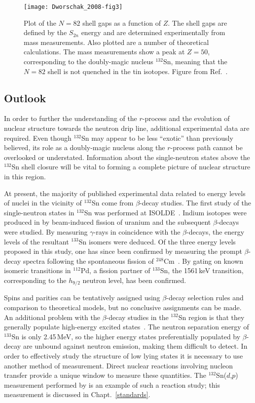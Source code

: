 \begin{figure}%
\centering
\texttt{[image: Dworschak\_2008-fig3]}%
\caption[Plot of the $N=82$ shell gaps as a function of $Z$]{Plot of the $N=82$ shell gaps as a function of $Z$.  The shell gaps are defined by the $S_{2n}$ energy and are determined experimentally from mass measurements.  Also plotted are a number of theoretical calculations.  The mass measurements show a peak at $Z=50$, corresponding to the doubly-magic nucleus $^{132}$Sn, meaning that the $N=82$ shell is not quenched in the tin isotopes.  Figure from Ref.~\cite[Fig.~3]{Dworschak_2008}.}%
\label{50_gap}%
\end{figure}

\subsection{Outlook}
In order to further the understanding of the $r$-process and the evolution of nuclear structure towards the neutron drip line, additional experimental data are required.  Even though $^{132}$Sn may appear to be less ``exotic'' than previously believed, its role as a doubly-magic nucleus along the $r$-process path cannot be overlooked or understated.  Information about the single-neutron states above the $^{132}$Sn shell closure will be vital to forming a complete picture of nuclear structure in this region.

At present, the majority of published experimental data related to energy levels of nuclei in the vicinity of $^{132}$Sn come from $\beta$-decay studies.  The first study of the single-neutron states in $^{132}$Sn was performed at ISOLDE~\cite{Hoff_1996}.  Indium isotopes were produced in by beam-induced fission of uranium and the subsequent $\beta$-decays were studied.  By measuring $\gamma$-rays in coincidence with the $\beta$-decays, the energy levels of the resultant $^{133}$Sn isomers were deduced.  Of the three energy levels proposed in this study, one has since been confirmed by measuring the prompt $\beta$-decay spectra following the spontaneous fission of $^{248}$Cm~\cite{Urban_1999}.  By gating on known isomeric transitions in $^{112}$Pd, a fission partner of $^{133}$Sn, the 1561\,keV transition, corresponding to the $h_{9/2}$ neutron level, has been confirmed.

Spins and parities can be tentatively assigned using $\beta$-decay selection rules and comparison to theoretical models, but no conclusive assignments can be made.  An additional problem with the $\beta$-decay studies in the $^{132}$Sn region is that they generally populate high-energy excited states~\cite{Hoff_1996}. The neutron separation energy of $^{133}$Sn is only 2.45\,MeV, so the higher energy states preferentially populated by $\beta$-decay are unbound against neutron emission, making them difficult to detect.   In order to effectively study the structure of low lying states it is necessary to use another method of measurement.  Direct nuclear reactions involving nucleon transfer provide a unique window to measure these quantities.  The $^{132}$Sn($d$,$p$) measurement performed by \citet{Jones_2010} is an example of such a reaction study; this measurement is discussed in Chapt.~\ref{standards}.
